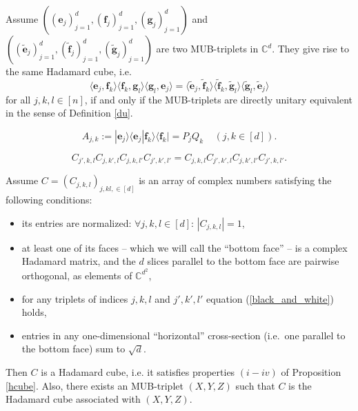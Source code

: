 \documentclass[10pt,a4paper]{amsart}
\newcommand{\C}{\mathbb{C}}
\newcommand{\eb}{\ensuremath{\mathbf{e}}}
\newcommand{\fb}{\ensuremath{\mathbf{f}}}
\newcommand{\gb}{\ensuremath{\mathbf{g}}}
\begin{document}
\begin{proposition}
\label{prop:triplet_equiv}
Assume
$((\eb_j)_{j=1}^d,(\fb_j)_{j=1}^d,(\gb_j)_{j=1}^d)$ and
$((\tilde{\eb}_j)_{j=1}^d,(\tilde{\fb}_j)_{j=1}^d,(\tilde{\gb}_j)_{j=1}^d)$
are two MUB-triplets in $\C^d$. They
give rise to the same Hadamard cube, i.e. 
$$
\langle \eb_j, \fb_k\rangle 
\langle \fb_k, \gb_l\rangle
\langle \gb_l, \eb_j\rangle 
= 
\langle \tilde{\eb}_j, \tilde{\fb}_k\rangle 
\langle \tilde{\fb}_k, \tilde{\gb}_l\rangle
\langle \tilde{\gb}_l, \tilde{\eb}_j\rangle 
$$
for all $j,k,l\in [n]$, if and only if the MUB-triplets  are directly unitary equivalent in the sense of Definition \ref{du}.
\end{proposition}

\begin{equation}\label{pq}
A_{j,k} := | \eb_j\rangle\langle\eb_j|
\fb_k\rangle\langle\fb_k|=P_jQ_k\;\;\;\;
(j,k\in [d]).    
\end{equation}

\begin{equation}
\label{black_and_white}
C_{j',k,l} C_{j,k',l} C_{j,k,l'} C_{j',k',l'} = C_{j,k,l} C_{j',k',l} C_{j,k',l'} C_{j',k,l'}.
\end{equation}

\begin{proposition}\label{misi}
Assume $C=(C_{j,k,l})_{j,kl,\in [d]}$ is an array of complex numbers satisfying the following conditions:
\begin{itemize}
 \item[i')] its entries are normalized: $\forall j,k,l\in[d]$: $|C_{j,k,l}|=1$,
\item[ii')] at least one of its faces -- which we will call the ``bottom face'' -- is a complex Hadamard matrix, and the $d$ slices parallel to the bottom face are pairwise orthogonal, as elements of $\mathbb C^{d^2}$, 
\item[iii')] for any triplets of
indices $j,k,l$ and $j',k',l'$ equation (\ref{black_and_white}) holds,
\item[iv')]
entries in any one-dimensional ``horizontal'' cross-section (i.e.\ one parallel to the bottom face) 
sum to $\sqrt{d}$.
\end{itemize}
Then $C$ is a Hadamard cube, i.e. it satisfies properties $(i-iv)$ of Proposition \ref{hcube}. Also, there exists an MUB-triplet $(X, Y, Z)$ such that $C$ is the Hadamard cube associated with $(X, Y, Z)$.
\end{proposition} 
\end{document}
